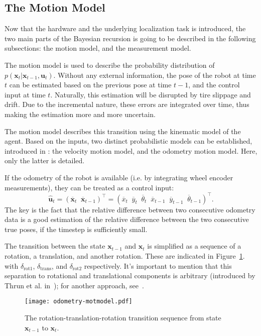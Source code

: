 \subsection{The Motion Model}\label{subsec:mot-model}
Now that the hardware and the underlying localization task is introduced, the two main parts of the
Bayesian recursion is going to be described in the following subsections: the motion model, and the measurement model.

The motion model is used to describe the probability distribution of
$p(\mathbf{x}_t | \mathbf{x}_{t-1},\mathbf{u}_t)$. \linebreak
Without any external information, the pose of the robot at time $t$ can be estimated based on the previous pose
at time $t-1$, and the control input at time $t$. Naturally, this estimation will be disrupted by tire slippage and drift.
Due to the incremental nature, these errors are integrated over time, thus making the estimation more and more
uncertain.

The motion model describes this transition using the kinematic model of the agent.
Based on the inputs, two distinct probabilistic models can be established, introduced in \cite{Thrun2005}: the velocity motion model,
and the odometry motion model. Here, only the latter is detailed.

If the odometry of the robot is available (i.e. by integrating wheel encoder measurements),
they can be treated as a control input:
\begin{equation}\label{eq:odom-raw-input}
    \hat{\mathbf{u}}_t = (\overline{\mathbf{x}}_t\;\;\overline{\mathbf{x}}_{t-1})^\top =
    \left(\overline{x}_t\;\;\overline{y}_t\;\;\overline{\theta}_t\;\;\overline{x}_{t-1}\;\;\overline{y}_{t-1}\;\;\overline{\theta}_{t-1}\right)^\top.
\end{equation}
The key is the fact that the relative difference between
two consecutive odometry data is a good estimation of the relative difference between
the two consecutive true poses, if the timestep is sufficiently small.

The transition between the state $\mathbf{x}_{t-1}$ and $\mathbf{x}_{t}$ is simplified as a sequence of a rotation, a translation,
and another rotation.
These are indicated in Figure~\ref{fig:odom-mot-model}. with $\delta_{\mathrm{rot1}}$, $\delta_{\mathrm{trans}}$,
and $\delta_{\mathrm{rot2}}$ respectively.
It's important to mention that this separation to rotational and translational components is arbitrary
(introduced by Thrun et al. in~\cite{Thrun2005}); for another approach, see~\cite{Eliazar2004}.
\begin{figure}[htbp]
    \centering
    \texttt{[image: odometry-motmodel.pdf]}
    \caption{The rotation-translation-rotation transition sequence from state $\mathbf{x}_{t-1}$ to $\mathbf{x}_{t}$.}
    \label{fig:odom-mot-model}
\end{figure}

